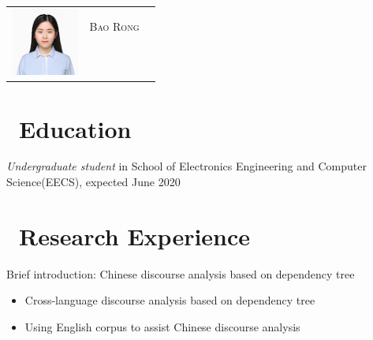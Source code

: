 \documentclass{resume}
\begin{document}

\Large{
  \begin{tabu}{ c l r }
    & \scshape{Bao Rong} \\
    &  \\
    & \\
    \\
    \\
  \end{tabu}
}


\section{\faGraduationCap\ Education}
\textit{Undergraduate student} in School of Electronics Engineering and Computer Science(EECS), expected June 2020


\section{\faUsers\ Research Experience}

Brief introduction: Chinese discourse analysis based on dependency tree
\begin{itemize}
  \item Cross-language discourse analysis based on dependency tree
  \item Using English corpus to assist Chinese discourse analysis
\end{itemize}
\end{document}
